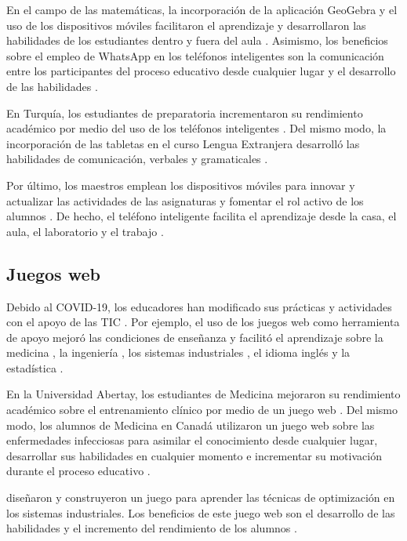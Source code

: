 \documentclass[spanish]{textolivre}
\begin{document}
En el campo de las matemáticas, la incorporación de la aplicación GeoGebra y el uso de los dispositivos móviles facilitaron el aprendizaje y desarrollaron las habilidades de los estudiantes dentro y fuera del aula \cite{samura2021}. Asimismo, los beneficios sobre el empleo de WhatsApp en los teléfonos inteligentes son la comunicación entre los participantes del proceso educativo desde cualquier lugar y el desarrollo de las habilidades \cite{morsidi2021}.

En Turquía, los estudiantes de preparatoria incrementaron su rendimiento académico por medio del uso de los teléfonos inteligentes \cite{sumuer2021}. Del mismo modo, la incorporación de las tabletas en el curso Lengua Extranjera desarrolló las habilidades de comunicación, verbales y gramaticales \cite{park2020}.

Por último, los maestros emplean los dispositivos móviles para innovar y actualizar las actividades de las asignaturas y fomentar el rol activo de los alumnos \cite{park2020, sumuer2021}. De hecho, el teléfono inteligente facilita el aprendizaje desde la casa, el aula, el laboratorio y el trabajo \cite{li2019, padmo2019}.

\subsection{Juegos web}\label{sec-formato}
Debido al COVID-19, los educadores han modificado sus prácticas y actividades con el apoyo de las TIC \cite{bawaaneh2021, saribas2021}. Por ejemplo, el uso de los juegos web como herramienta de apoyo mejoró las condiciones de enseñanza  y facilitó el aprendizaje sobre la medicina \cite{donald2017, smith2020}, la ingeniería \cite{de_la_pena_esteban2020}, los sistemas industriales \cite{de_la_pena_esteban2020}, el idioma inglés \cite{licorish2018} y la estadística \cite{salas-rueda2020}.

En la Universidad Abertay, los estudiantes de Medicina mejoraron su rendimiento académico sobre el entrenamiento clínico por medio de un juego web \cite{donald2017}. Del mismo modo, los alumnos de Medicina en Canadá utilizaron un juego web sobre las enfermedades infecciosas para asimilar el conocimiento desde cualquier lugar, desarrollar sus habilidades en cualquier momento e incrementar su motivación durante el proceso educativo \cite{smith2020}.

\textcite{de_la_pena_esteban2020} diseñaron y construyeron un juego para aprender las técnicas de optimización en los sistemas industriales. Los beneficios de este juego web son el desarrollo de las habilidades y el incremento del rendimiento de los alumnos \cite{de_la_pena_esteban2020}.
\end{document}
